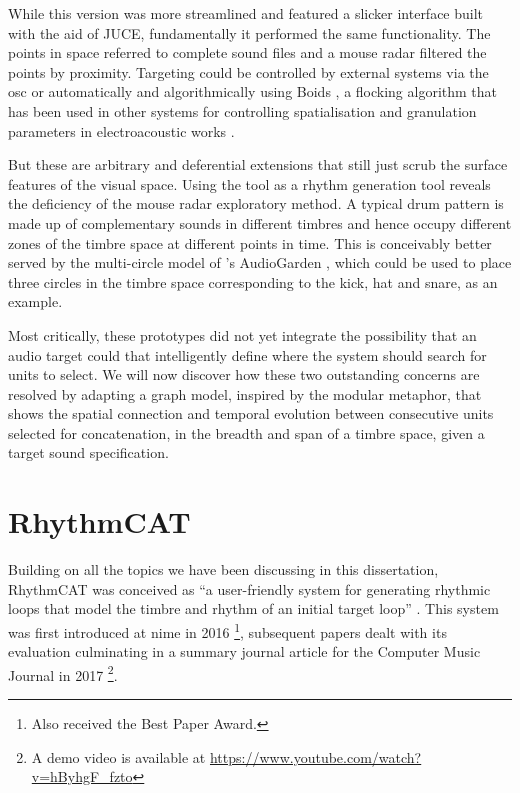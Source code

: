 While this version was more streamlined and featured a slicker interface built with the aid of JUCE, fundamentally it performed the same functionality. The points in space referred to complete sound files and a mouse radar filtered the points by proximity. Targeting could be controlled by external systems via the \acrshort{osc} or automatically and algorithmically using Boids \citep{Reynolds1987}, a flocking algorithm that has been used in other systems for controlling spatialisation and granulation parameters in electroacoustic works \citep{Kim-Boyle2006, Wilson2008, Barreiro2010}. 

But these are arbitrary and deferential extensions that still just scrub the surface features of  the visual space. Using the tool as a rhythm generation tool reveals the deficiency of the mouse radar exploratory method. A typical drum pattern is made up of complementary sounds in different timbres and hence occupy different zones of the timbre space at different points in time. This is conceivably better served by the multi-circle model of \citeauthor{Frisson2010}'s AudioGarden \citeyearpar{Frisson2010}, which could be used to place three circles in the timbre space corresponding to the kick, hat and snare, as an example.


Most critically, these prototypes did not yet integrate the possibility that an audio target could that intelligently define where the system should search for units to select. We will  now discover how these two outstanding concerns are resolved by adapting a graph model, inspired by the modular metaphor, that shows the spatial connection and temporal evolution between consecutive units selected for concatenation, in the breadth and span of a timbre space, given a target sound specification.

\section{RhythmCAT}

Building on all the topics we have been discussing in this dissertation, RhythmCAT was conceived as ``a user-friendly system for generating rhythmic loops that model the timbre and rhythm of an initial target loop'' \citep{Nuanain2017b}. This system was first introduced at \acrfull{nime} in 2016 \citep{Nuanain2016a}\footnote{Also received the Best Paper Award.}, subsequent papers dealt with its evaluation \citep{Nuanain2016b, Nuanain2016c} culminating in a summary journal article for the Computer Music Journal in 2017 \citep{Nuanain2017b}\footnote{A demo video is available at \url{https://www.youtube.com/watch?v=hByhgF_fzto}}.


